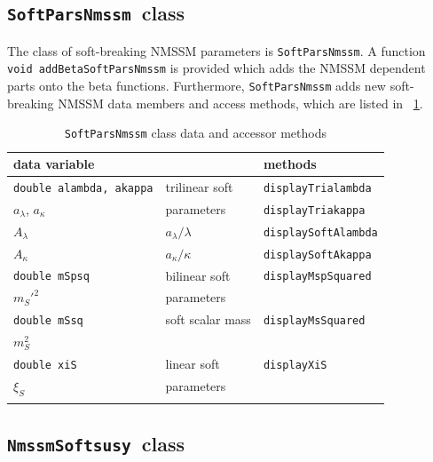 \documentclass[final,3p,times]{elsarticle}
\def\code#1{\small{\tt #1}\normalsize}
\begin{document}
\subsection{\code{SoftParsNmssm}~class}
\label{nmssmsoftpars}

The class of soft-breaking NMSSM parameters is
\code{SoftParsNmssm}. A function 
\code{void addBetaSoftParsNmssm}
is provided which adds the NMSSM dependent parts onto the beta
functions. 
Furthermore, \code{SoftParsNmssm} adds new soft-breaking NMSSM data
members and access methods, which are listed in
\tablename~\ref{tab:nmssmsoftpars}.
%
\begin{table}
  \centering
  \begin{tabular}{lll}
    data variable & & methods \\\hline
    \code{\small double alambda, akappa} & trilinear soft &
    \code{\small displayTrialambda}
    \\
    $a_\lambda$, $a_\kappa$ & parameters & \code{\small displayTriakappa}
    \\\hline
    $A_\lambda$ & $a_\lambda / \lambda$ & \code{\small displaySoftAlambda}
    \\
    $A_\kappa$ & $a_\kappa / \kappa$ & \code{\small displaySoftAkappa}
    \\\hline
    \code{\small double mSpsq} & bilinear soft &
    \code{\small displayMspSquared}
    \\
    $m_{S}'^2$ & parameters &
    \\\hline
    \code{\small double mSsq} & soft scalar mass &
    \code{\small displayMsSquared}
    \\
    $m_S^2$ & &
    \\\hline
    \code{\small double xiS} & linear soft &
    \code{\small displayXiS}
    \\
    $\xi_S$ & parameters &
    \\\hline
    \normalsize
  \end{tabular}
  \caption{\code{SoftParsNmssm} class data and accessor methods
    \label{tab:nmssmsoftpars}}
\end{table}

\subsection{\code{NmssmSoftsusy}~class}
\label{nmssmsoftsusy}
\end{document}
